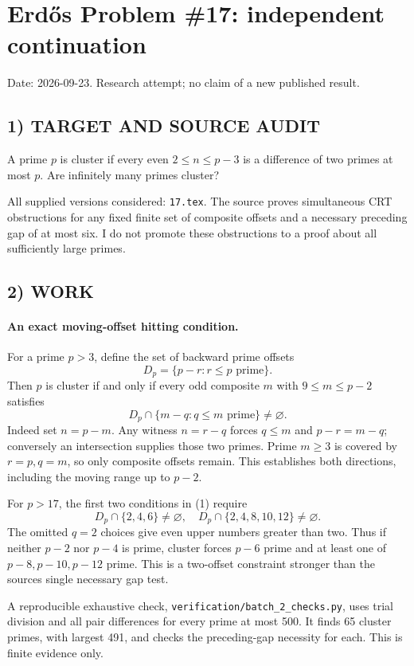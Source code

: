 \section{Erd\H{o}s Problem \#17: independent continuation}
\noindent Date: 2026-09-23. Research attempt; no claim of a new published result.
\subsection{1) TARGET AND SOURCE AUDIT}
A prime $p$ is cluster if every even $2\le n\le p-3$ is a difference of two primes at most $p$. Are infinitely many primes cluster?

All supplied versions considered: \texttt{17.tex}.
The source proves simultaneous CRT obstructions for any fixed finite set of composite offsets and a necessary preceding gap of at most six. I do not promote these obstructions to a proof about all sufficiently large primes.
\subsection{2) WORK}
\paragraph{An exact moving-offset hitting condition.}
For a prime $p>3$, define the set of backward prime offsets
\[
D_p=\{p-r:r\le p\text{ prime}\}.
\]
Then $p$ is cluster if and only if every odd composite $m$ with $9\le m\le p-2$ satisfies
\[
D_p\cap\{m-q:q\le m\text{ prime}\}\ne\varnothing. \tag{1}
\]
Indeed set $n=p-m$. Any witness $n=r-q$ forces $q\le m$ and $p-r=m-q$; conversely an intersection supplies those two primes. Prime $m\ge3$ is covered by $r=p,q=m$, so only composite offsets remain. This establishes both directions, including the moving range up to $p-2$.

For $p>17$, the first two conditions in (1) require
\[
D_p\cap\{2,4,6\}\ne\varnothing,\quad
D_p\cap\{2,4,8,10,12\}\ne\varnothing.
\]
The omitted $q=2$ choices give even upper numbers greater than two. Thus if neither $p-2$ nor $p-4$ is prime, cluster forces $p-6$ prime and at least one of $p-8,p-10,p-12$ prime. This is a two-offset constraint stronger than the source\textquotesingle s single necessary gap test.

A reproducible exhaustive check, \texttt{verification/batch\_2\_checks.py}, uses trial division and all pair differences for every prime at most 500. It finds 65 cluster primes, with largest 491, and checks the preceding-gap necessity for each. This is finite evidence only.
